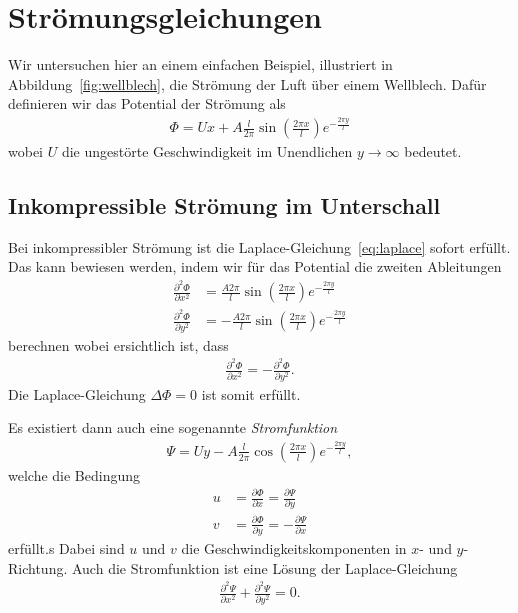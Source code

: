 %
%
%
\section{Strömungsgleichungen\label{ueberschall:stroemungsgleichung}}
Wir untersuchen hier an einem einfachen Beispiel, 
illustriert in Abbildung~\ref{fig:wellblech},
die Strömung der Luft über einem Wellblech.
Dafür definieren wir das Potential der Strömung als
\begin{align*}
    \Phi
    =
    U x + A \frac{l}{2 \pi} \sin\left(\frac{2 \pi x}{l}\right)
    e^{-\frac{2 \pi y}{l}}
\end{align*}
wobei $U$ die ungestörte Geschwindigkeit im 
Unendlichen $y\rightarrow\infty$ bedeutet.


\subsection{Inkompressible Strömung im Unterschall}
Bei inkompressibler Strömung ist die
Laplace-Gleichung~\eqref{eq:laplace} sofort erfüllt.
Das kann bewiesen werden, indem wir für das Potential
die zweiten Ableitungen
\begin{align*}
    \frac{\partial^2 \Phi}{\partial x^2}
    &= \frac{A 2 \pi}{l} \sin\left(\frac{2 \pi x}{l}\right)
    e^{-\frac{2 \pi y}{l}} \\
    \frac{\partial^2 \Phi}{\partial y^2}
    &= -\frac{A 2 \pi}{l} \sin\left(\frac{2 \pi x}{l}\right)
     e^{-\frac{2 \pi y}{l}}
\end{align*}
berechnen wobei ersichtlich ist, dass
\begin{align*}
    \frac{\partial^2 \Phi}{\partial x^2}
    =
    -\frac{\partial^2 \Phi}{\partial y^2}.
\end{align*}
Die Laplace-Gleichung $\Delta \Phi = 0$ ist somit erfüllt.

Es existiert dann auch eine sogenannte \emph{Stromfunktion}
\begin{align*}
    \Psi
    =
    U y - A \frac{l}{2 \pi} \cos\left(\frac{2 \pi x}{l}\right)
     e^{-\frac{2 \pi y}{l}},
\end{align*}
welche die Bedingung
\begin{align*}
    u 
    &=
    \frac{\partial \Phi}{\partial x}
    =
    \frac{\partial \Psi}{\partial y}
    \\
    v
    &=
    \frac{\partial \Phi}{\partial y}
    =
    -\frac{\partial \Psi}{\partial x}
\end{align*}
erfüllt.s
Dabei sind $u$ und $v$ die Geschwindigkeitskomponenten in $x$- und $y$-Richtung.
Auch die Stromfunktion ist eine Lösung der Laplace-Gleichung
\begin{align*}
    \frac{\partial^2 \Psi}{\partial x^2}
    +
    \frac{\partial^2 \Psi}{\partial y^2}
    =
    0.
\end{align*}

